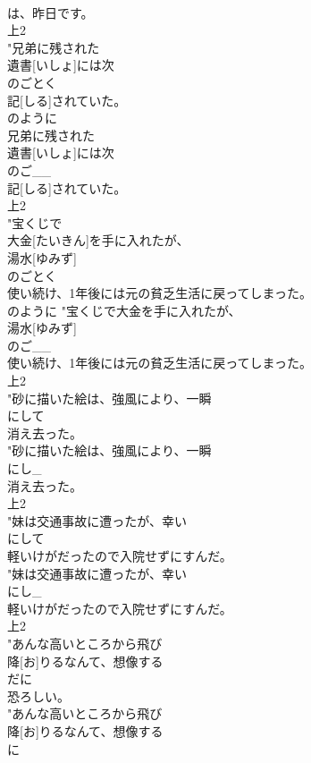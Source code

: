 \documentclass[8pt]{extreport}
\begin{document}
\begin{CJK}{UTF8}{min}
\\	は、昨日です。 
\\	上2
\\	"兄弟に残された
\\	遺書[いしょ]には次
\\	のごとく
\\	記[しる]されていた。
\\	のように	
\\	兄弟に残された
\\	遺書[いしょ]には次
\\	のご__
\\	記[しる]されていた。
\\	上2
\\	"宝くじで
\\	大金[たいきん]を手に入れたが、
\\	湯水[ゆみず]
\\	のごとく
\\	使い続け、1年後には元の貧乏生活に戻ってしまった。
\\	のように	"宝くじで大金を手に入れたが、
\\	湯水[ゆみず]
\\	のご__
\\	使い続け、1年後には元の貧乏生活に戻ってしまった。
\\	上2
\\	"砂に描いた絵は、強風により、一瞬
\\	にして
\\	消え去った。
\\	"砂に描いた絵は、強風により、一瞬
\\	にし_
\\	消え去った。
\\	上2
\\	"妹は交通事故に遭ったが、幸い
\\	にして
\\	軽いけがだったので入院せずにすんだ。
\\	"妹は交通事故に遭ったが、幸い
\\	にし_
\\	軽いけがだったので入院せずにすんだ。
\\	上2
\\	"あんな高いところから飛び
\\	降[お]りるなんて、想像する
\\	だに
\\	恐ろしい。
\\	"あんな高いところから飛び
\\	降[お]りるなんて、想像する
\\	に

\end{CJK}
\end{document}
